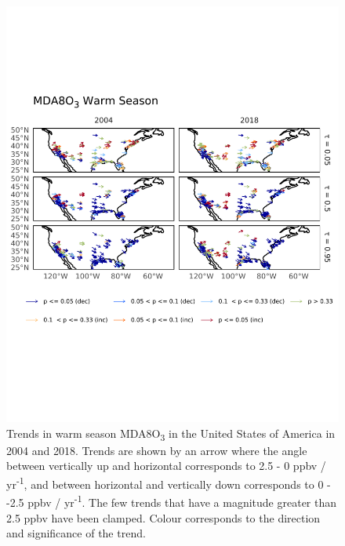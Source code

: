 \documentclass[journal abbreviation, manuscript]{copernicus}
\begin{document}
\begin{figure}[p]
\centering
\includegraphics[height=0.9\textheight]{figures/paper_figures/f06_o3_map_mda8_warm_us_o3.pdf}
\caption{Trends in warm season MDA8O\textsubscript{3} in the United States of America in 2004 and 2018. Trends are shown by an arrow where the angle between vertically up and horizontal corresponds to 2.5 - 0 ppbv / yr\textsuperscript{-1}, and between horizontal and vertically down corresponds to 0 - -2.5 ppbv / yr\textsuperscript{-1}. The few trends that have a magnitude greater than 2.5 ppbv have been clamped. Colour corresponds to the direction and significance of the trend.}
\label{fig:o3_map_us_mda8_warm}
\end{figure}
\clearpage


\end{document}
